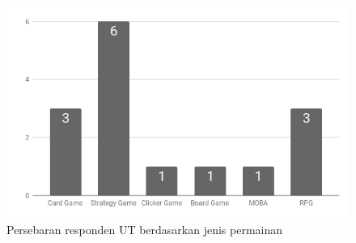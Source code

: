 	\begin{figure}
		\includegraphics[width=\linewidth]{pics/UT/jenis-game}
		\caption{Persebaran responden UT berdasarkan jenis permainan}
		\centering
	\end{figure}
